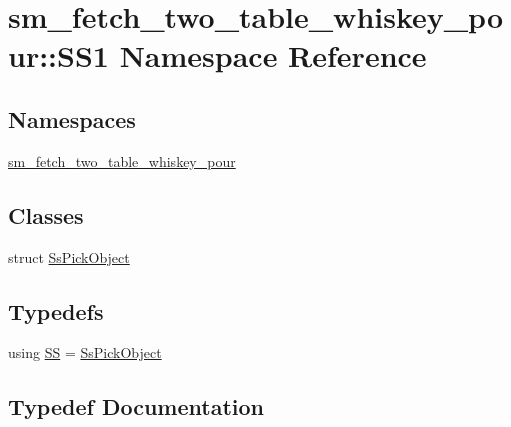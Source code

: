 \hypertarget{namespacesm__fetch__two__table__whiskey__pour_1_1SS1}{}\section{sm\+\_\+fetch\+\_\+two\+\_\+table\+\_\+whiskey\+\_\+pour\+:\+:S\+S1 Namespace Reference}
\label{namespacesm__fetch__two__table__whiskey__pour_1_1SS1}
\subsection*{Namespaces}
\begin{DoxyCompactItemize}
\item 
 \hyperlink{namespacesm__fetch__two__table__whiskey__pour_1_1SS1_1_1sm__fetch__two__table__whiskey__pour}{sm\+\_\+fetch\+\_\+two\+\_\+table\+\_\+whiskey\+\_\+pour}
\end{DoxyCompactItemize}
\subsection*{Classes}
\begin{DoxyCompactItemize}
\item 
struct \hyperlink{structsm__fetch__two__table__whiskey__pour_1_1SS1_1_1SsPickObject}{Ss\+Pick\+Object}
\end{DoxyCompactItemize}
\subsection*{Typedefs}
\begin{DoxyCompactItemize}
\item 
using \hyperlink{namespacesm__fetch__two__table__whiskey__pour_1_1SS1_ace01409135917e2e5d04ee7702496158}{SS} = \hyperlink{structsm__fetch__two__table__whiskey__pour_1_1SS1_1_1SsPickObject}{Ss\+Pick\+Object}
\end{DoxyCompactItemize}


\subsection{Typedef Documentation}
\mbox{\label{namespacesm__fetch__two__table__whiskey__pour_1_1SS1_ace01409135917e2e5d04ee7702496158}} 
